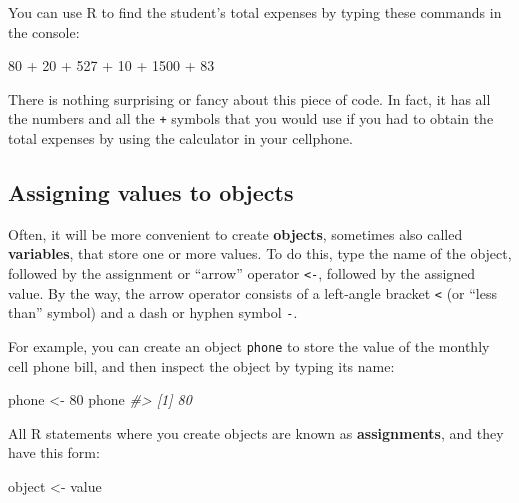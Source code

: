 \documentclass[
]{book}
\newenvironment{Shaded}{\begin{snugshade}}{\end{snugshade}}
\newcommand{\CommentTok}[1]{\textcolor[rgb]{0.56,0.35,0.01}{\textit{#1}}}
\newcommand{\DecValTok}[1]{\textcolor[rgb]{0.00,0.00,0.81}{#1}}
\newcommand{\NormalTok}[1]{#1}
\newcommand{\OtherTok}[1]{\textcolor[rgb]{0.56,0.35,0.01}{#1}}
\newcommand{\SpecialCharTok}[1]{\textcolor[rgb]{0.00,0.00,0.00}{#1}}
\begin{document}
You can use R to find the student's total expenses by typing these commands in
the console:

\begin{Shaded}
\begin{Highlighting}[]
\DecValTok{80} \SpecialCharTok{+} \DecValTok{20} \SpecialCharTok{+} \DecValTok{527} \SpecialCharTok{+} \DecValTok{10} \SpecialCharTok{+} \DecValTok{1500} \SpecialCharTok{+} \DecValTok{83}
\end{Highlighting}
\end{Shaded}

There is nothing surprising or fancy about this piece of code. In fact, it has
all the numbers and all the \texttt{+} symbols that you would use if you had to obtain
the total expenses by using the calculator in your cellphone.

\hypertarget{assigning-values-to-objects}{%
\subsection{Assigning values to objects}\label{assigning-values-to-objects}}

Often, it will be more convenient to create \textbf{objects}, sometimes also called
\textbf{variables}, that store one or more values. To do this, type the name of the
object, followed by the assignment or ``arrow'' operator \texttt{\textless{}-}, followed by the
assigned value. By the way, the arrow operator consists of a left-angle bracket
\texttt{\textless{}} (or ``less than'' symbol) and a dash or hyphen symbol \texttt{-}.

For example, you can create an object \texttt{phone} to store the value of the monthly
cell phone bill, and then inspect the object by typing its name:

\begin{Shaded}
\begin{Highlighting}[]
\NormalTok{phone }\OtherTok{\textless{}{-}} \DecValTok{80}
\NormalTok{phone}
\CommentTok{\#\textgreater{} [1] 80}
\end{Highlighting}
\end{Shaded}

All R statements where you create objects are known as \textbf{assignments}, and
they have this form:

\begin{Shaded}
\begin{Highlighting}[]
\NormalTok{object }\OtherTok{\textless{}{-}}\NormalTok{ value}
\end{Highlighting}
\end{Shaded}
\end{document}
